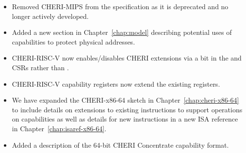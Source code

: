 \begin{itemize}
\item Removed CHERI-MIPS from the specification as it is deprecated
  and no longer actively developed.

\item Added a new section in Chapter~\ref{chap:model} describing
  potential uses of capabilities to protect physical addresses.

\item CHERI-RISC-V now enables/disables CHERI extensions via a bit in
  the \menvcfg{} and \senvcfg{} CSRs rather than \xccsr{}.

\item CHERI-RISC-V \xScratchC{} capability registers now extend the
  existing \xscratch{} registers.

\item We have expanded the CHERI-x86-64 sketch in
  Chapter~\ref{chap:cheri-x86-64} to include details on extensions to
  existing instructions to support operations on capabilities as well
  as details for new instructions in a new ISA reference in
  Chapter~\ref{chap:isaref-x86-64}.

\item Added a description of the 64-bit CHERI Concentrate capability
  format.
\end{itemize}

